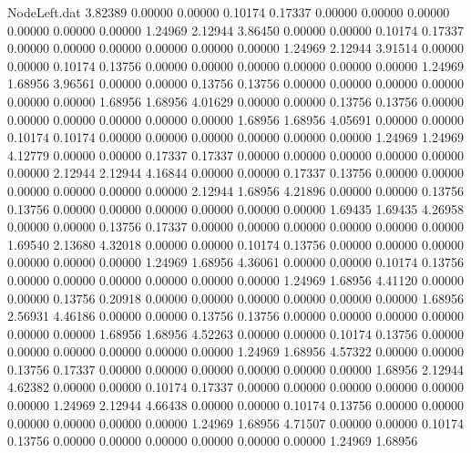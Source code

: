 \begin{filecontents}{NodeLeft.dat}
   3.82389    0.00000    0.00000     0.10174    0.17337    0.00000    0.00000    0.00000    0.00000    0.00000    0.00000    1.24969    2.12944
   3.86450    0.00000    0.00000     0.10174    0.17337    0.00000    0.00000    0.00000    0.00000    0.00000    0.00000    1.24969    2.12944
   3.91514    0.00000    0.00000     0.10174    0.13756    0.00000    0.00000    0.00000    0.00000    0.00000    0.00000    1.24969    1.68956
   3.96561    0.00000    0.00000     0.13756    0.13756    0.00000    0.00000    0.00000    0.00000    0.00000    0.00000    1.68956    1.68956
   4.01629    0.00000    0.00000     0.13756    0.13756    0.00000    0.00000    0.00000    0.00000    0.00000    0.00000    1.68956    1.68956
   4.05691    0.00000    0.00000     0.10174    0.10174    0.00000    0.00000    0.00000    0.00000    0.00000    0.00000    1.24969    1.24969
   4.12779    0.00000    0.00000     0.17337    0.17337    0.00000    0.00000    0.00000    0.00000    0.00000    0.00000    2.12944    2.12944
   4.16844    0.00000    0.00000     0.17337    0.13756    0.00000    0.00000    0.00000    0.00000    0.00000    0.00000    2.12944    1.68956
   4.21896    0.00000    0.00000     0.13756    0.13756    0.00000    0.00000    0.00000    0.00000    0.00000    0.00000    1.69435    1.69435
   4.26958    0.00000    0.00000     0.13756    0.17337    0.00000    0.00000    0.00000    0.00000    0.00000    0.00000    1.69540    2.13680
   4.32018    0.00000    0.00000     0.10174    0.13756    0.00000    0.00000    0.00000    0.00000    0.00000    0.00000    1.24969    1.68956
   4.36061    0.00000    0.00000     0.10174    0.13756    0.00000    0.00000    0.00000    0.00000    0.00000    0.00000    1.24969    1.68956
   4.41120    0.00000    0.00000     0.13756    0.20918    0.00000    0.00000    0.00000    0.00000    0.00000    0.00000    1.68956    2.56931
   4.46186    0.00000    0.00000     0.13756    0.13756    0.00000    0.00000    0.00000    0.00000    0.00000    0.00000    1.68956    1.68956
   4.52263    0.00000    0.00000     0.10174    0.13756    0.00000    0.00000    0.00000    0.00000    0.00000    0.00000    1.24969    1.68956
   4.57322    0.00000    0.00000     0.13756    0.17337    0.00000    0.00000    0.00000    0.00000    0.00000    0.00000    1.68956    2.12944
   4.62382    0.00000    0.00000     0.10174    0.17337    0.00000    0.00000    0.00000    0.00000    0.00000    0.00000    1.24969    2.12944
   4.66438    0.00000    0.00000     0.10174    0.13756    0.00000    0.00000    0.00000    0.00000    0.00000    0.00000    1.24969    1.68956
   4.71507    0.00000    0.00000     0.10174    0.13756    0.00000    0.00000    0.00000    0.00000    0.00000    0.00000    1.24969    1.68956

\end{filecontents}
